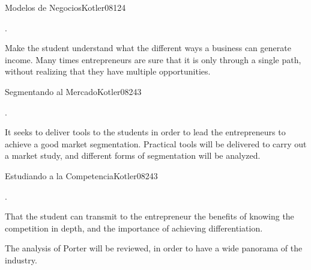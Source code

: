 \begin{syllabus}
\begin{outcomes}
    \item {}
    \item {}
\end{outcomes}

\begin{competences}
    \item {}
\end{competences}

\begin{unit}{}{Modelos de Negocios}{Kotler08}{12}{4}
   \begin{topics}
      \item .
   \end{topics}

   \begin{learningoutcomes}
      \item Make the student understand what the different ways a business can generate income. Many times entrepreneurs are sure that it is only through a single path, without realizing that they have multiple opportunities.
   \end{learningoutcomes}

\end{unit}

\begin{unit}{}{Segmentando al Mercado}{Kotler08}{24}{3}
   \begin{topics}
      \item .
   \end{topics}

   \begin{learningoutcomes}
      \item It seeks to deliver tools to the students in order to lead the entrepreneurs to achieve a good market segmentation. Practical tools will be delivered to carry out a market study, and different forms of segmentation will be analyzed.
   \end{learningoutcomes}

\end{unit}

\begin{unit}{}{Estudiando a la Competencia}{Kotler08}{24}{3}
   \begin{topics}
      \item .
   \end{topics}

   \begin{learningoutcomes}
      \item That the student can transmit to the entrepreneur the benefits of knowing the competition in depth, and the importance of achieving differentiation.
      \item The analysis of Porter will be reviewed, in order to have a wide panorama of the industry.
   \end{learningoutcomes}


\end{unit}
\end{syllabus}
